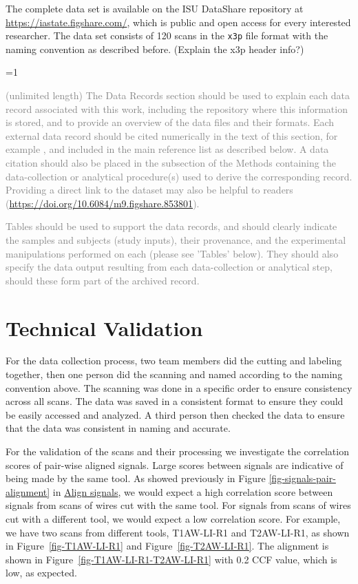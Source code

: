 \documentclass[fleqn,10pt]{wlscirep}
\newcommand{\tom}[1]{{\textcolor{RedOrange}{#1}}}
\newcommand{\ifinstruction}{0} %
\begin{document}
The complete data set is available on the ISU DataShare repository at
\href{https://iastate.figshare.com/}{https://iastate.figshare.com/},
which is public and open access for every interested researcher. The
data set consists of 120 scans in the \texttt{x3p} file format with the
naming convention as described before.
\tom{(Explain the x3p header info?)}

\ifnum \ifinstruction=1

\textcolor{gray}{(unlimited length) The Data Records section should be used to explain each data record associated with this work, including the repository where this information is stored, and to provide an overview of the data files and their formats. Each external data record should be cited numerically in the text of this section, for example \cite{Hao:gidmaps:2014}, and included in the main reference list as described below. A data citation should also be placed in the subsection of the Methods containing the data-collection or analytical procedure(s) used to derive the corresponding record. Providing a direct link to the dataset may also be helpful to readers (\hyperlink{https://doi.org/10.6084/m9.figshare.853801}{https://doi.org/10.6084/m9.figshare.853801}).}

\textcolor{gray}{Tables should be used to support the data records, and should clearly indicate the samples and subjects (study inputs), their provenance, and the experimental manipulations performed on each (please see 'Tables' below). They should also specify the data output resulting from each data-collection or analytical step, should these form part of the archived record.}
\fi

\section*{Technical Validation}\label{sec-technical-validation}

For the data collection process, two team members did the cutting and
labeling together, then one person did the scanning and named according
to the naming convention above. The scanning was done in a specific
order to ensure consistency across all scans. The data was saved in a
consistent format to ensure they could be easily accessed and analyzed.
A third person then checked the data to ensure that the data was
consistent in naming and accurate.

For the validation of the scans and their processing we investigate the
correlation scores of pair-wise aligned signals. Large scores between
signals are indicative of being made by the same tool. As showed
previously in Figure \ref{fig-signals-pair-alignment} in
\hyperref[sec-align-signals]{Align signals}, we would expect a high
correlation score between signals from scans of wires cut with the same
tool. For signals from scans of wires cut with a different tool, we
would expect a low correlation score. For example, we have two scans
from different tools, T1AW-LI-R1 and T2AW-LI-R1, as shown in
Figure~\ref{fig-T1AW-LI-R1} and Figure~\ref{fig-T2AW-LI-R1}. The
alignment is shown in Figure~\ref{fig-T1AW-LI-R1-T2AW-LI-R1} with 0.2
CCF value, which is low, as expected.
\end{document}
